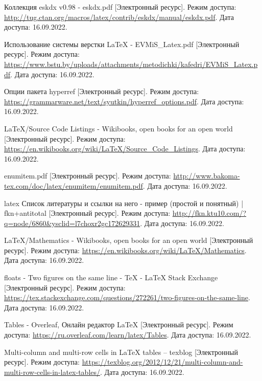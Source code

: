  \renewcommand{\addcontentsline}[3]{}%
  \renewcommand{\section}[2]{}%

  \begin{thebibliography}{}
    Коллекция eskdx v0.98 - eskdx.pdf
    [Электронный ресурс].
    Режим доступа: \url{http://tug.ctan.org/macros/latex/contrib/eskdx/manual/eskdx.pdf}.
    Дата доступа: 16.09.2022.
  
    Использование системы верстки LaTeX - EVMiS\_Latex.pdf
    [Электронный ресурс].
    Режим доступа: \url{https://www.bstu.by/uploads/attachments/metodichki/kafedri/EVMiS_Latex.pdf}.
    Дата доступа: 16.09.2022.
  
    Опции пакета hyperref
    [Электронный ресурс].
    Режим доступа: \url{https://grammarware.net/text/syutkin/hyperref_options.pdf}.
    Дата доступа: 16.09.2022.
  
    LaTeX/Source Code Listings - Wikibooks, open books for an open world
    [Электронный ресурс].
    Режим доступа: \url{https://en.wikibooks.org/wiki/LaTeX/Source_Code_Listings}.
    Дата доступа: 16.09.2022.
  
    enumitem.pdf
    [Электронный ресурс].
    Режим доступа: \url{http://www.bakoma-tex.com/doc/latex/enumitem/enumitem.pdf}.
    Дата доступа: 16.09.2022.
  
    latex Список литературы и ссылки на него - пример (простой и понятный) | fkn+antitotal
    [Электронный ресурс].
    Режим доступа: \url{http://fkn.ktu10.com/?q=node/6860&ysclid=l7choxr2gc172629331}.
    Дата доступа: 16.09.2022.

    LaTeX/Mathematics - Wikibooks, open books for an open world
    [Электронный ресурс].
    Режим доступа: \url{https://en.wikibooks.org/wiki/LaTeX/Mathematics}.
    Дата доступа: 16.09.2022.

    floats - Two figures on the same line - TeX - LaTeX Stack Exchange
    [Электронный ресурс].
    Режим доступа: \url{https://tex.stackexchange.com/questions/272261/two-figures-on-the-same-line}.
    Дата доступа: 16.09.2022.

    Tables - Overleaf, Онлайн редактор LaTeX
    [Электронный ресурс].
    Режим доступа: \url{https://ru.overleaf.com/learn/latex/Tables}.
    Дата доступа: 16.09.2022.

    Multi-column and multi-row cells in LaTeX tables – texblog
    [Электронный ресурс].
    Режим доступа: \url{https://texblog.org/2012/12/21/multi-column-and-multi-row-cells-in-latex-tables/}.
    Дата доступа: 16.09.2022.   
  \end{thebibliography}
\endgroup

\newpage
